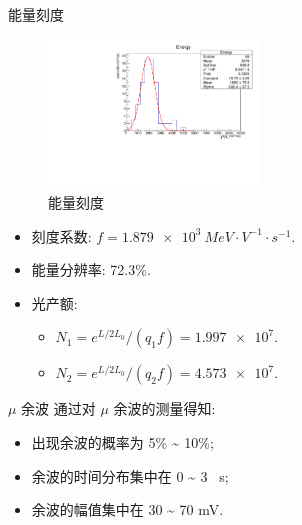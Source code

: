 \documentclass[10pt]{beamer}
\begin{document}
\begin{frame}[label={sec:org5405b08}]{能量刻度}
\begin{figure}[htbp]
\centering
\includegraphics[width=0.5\textwidth]{../../DetectorPerform/ECali/qqEdist.pdf}
\caption{能量刻度}
\end{figure}
\begin{itemize}
\item 刻度系数: \(f = \qty{1.879e3}{MeV \cdot V^{-1} \cdot s^{-1}}\).
\item 能量分辨率: 72.3\%.
\item 光产额:
\begin{itemize}
\item \(N_1 = e^{L/2L_0} / (q_1 f) = \num{1.997e7}\).
\item \(N_2 = e^{L/2L_0} / (q_2 f) = \num{4.573e7}\).
\end{itemize}
\end{itemize}
\end{frame}

\begin{frame}[label={sec:org4796c69}]{\(\mu\) 余波}
通过对 \(\mu\) 余波的测量得知:
\begin{itemize}
\item 出现余波的概率为 5\% \textasciitilde{} 10\%;
\item 余波的时间分布集中在 0 \textasciitilde{} 3 \unit{\mu s};
\item 余波的幅值集中在 30 \textasciitilde{} 70 \unit{mV}.
\end{itemize}
\end{frame}
\end{document}
